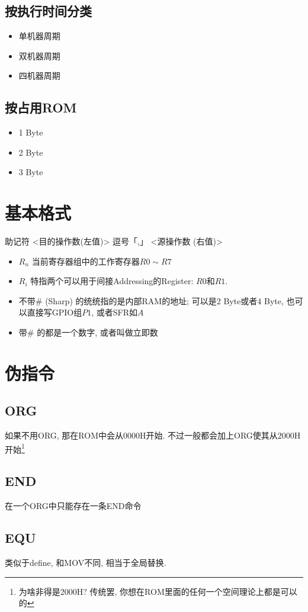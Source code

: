 \documentclass[a4paper]{report}
\begin{document}
\subsection{按执行时间分类}
\begin{itemize}
  \item 单机器周期
  \item 双机器周期
  \item 四机器周期
\end{itemize}
\subsection{按占用ROM}
\begin{itemize}
  \item 1 Byte
  \item 2 Byte
  \item 3 Byte
\end{itemize}
\section{基本格式}
助记符 <目的操作数(左值)> 逗号「,」 <源操作数 (右值)>
\begin{itemize}
  \item $R_n$ 当前寄存器组中的工作寄存器$R0\sim R7$
  \item $R_i$ 特指两个可以用于间接Addressing的Register: $R0$和$R1$.
  \item 不带$\#$ (Sharp) 的统统指的是内部RAM的地址; 可以是2 Byte或者4 Byte, 也可以直接写GPIO组$P1$, 或者SFR如$A$
  \item 带$\#$ 的都是一个数字, 或者叫做立即数
\end{itemize}
\section{伪指令}
\subsection{ORG}
如果不用ORG, 那在ROM中会从0000H开始. 不过一般都会加上ORG使其从2000H开始\footnote{为啥非得是2000H? 传统罢, 你想在ROM里面的任何一个空间理论上都是可以的}
\subsection{END}
在一个ORG中只能存在一条END命令
\subsection{EQU}
类似于define, 和MOV不同, 相当于全局替换. 
\end{document}
